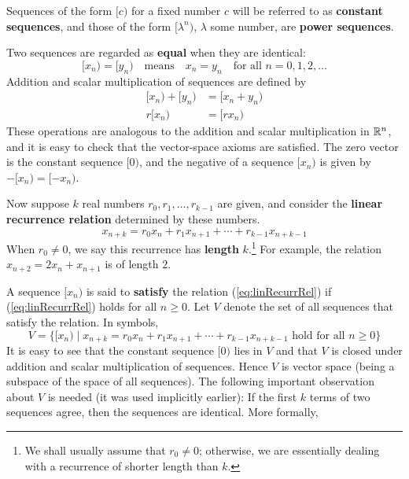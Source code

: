 \noindent Sequences of the form $[c)$ for a fixed number $c$ will be referred to as \textbf{constant sequences}, and those of the form $[\lambda^{n})$, $\lambda$ some number, are \textbf{power sequences}.


Two sequences are regarded as \textbf{equal} when they are identical:
\begin{equation*}
[x_n) = [y_n) \quad \mbox{means} \quad x_n = y_n \quad \mbox{for all } n = 0, 1, 2, \dots
\end{equation*}
Addition and scalar multiplication of sequences are defined by
\begin{align*}
[x_n) + [y_n) &= [x_n + y_n) \\
r[x_n) &= [rx_n)
\end{align*}
These operations are analogous to the addition and scalar multiplication in $\mathbb{R}^n$, and it is easy to check that the vector-space axioms are satisfied. The zero vector is the constant sequence $[0)$, and the negative of a sequence $[x_{n})$ is given by $-[x_{n}) = [-x_{n})$.


Now suppose $k$ real numbers $r_{0}, r_{1}, \dots, r_{k-1}$ are given, and consider the \textbf{linear recurrence relation} determined by these numbers.
\begin{equation}\label{eq:linRecurrRel}
x_{n+k} = r_{0}x_{n} + r_{1}x_{n+1} + \cdots + r_{k-1}x_{n+k-1}
\end{equation}
When $r_{0} \neq 0$, we say this recurrence has \textbf{length} $k$.\footnote{We shall usually assume that $r_{0} \neq 0$; otherwise, we are essentially dealing with a recurrence of shorter length than $k$.} For example, the relation $x_{n+2} = 2x_{n}+ x_{n+1}$ is of length $2$.


A sequence $[x_{n})$ is said to \textbf{satisfy} the relation (\ref{eq:linRecurrRel}) if (\ref{eq:linRecurrRel}) holds for all $n \geq 0$. Let $V$ denote the set of all sequences that satisfy the relation. In symbols,
\begin{equation*}
V = \{[x_n) \mid x_{n+k} = r_{0}x_{n} + r_{1}x_{n+1} + \cdots + r_{k-1}x_{n+k-1} \mbox{ hold for all } n \geq 0\}
\end{equation*}
It is easy to see that the constant sequence $[0)$ lies in $V$ and that $V$ is closed under addition and scalar multiplication of sequences. Hence $V$ is vector space (being a subspace of the space of all sequences). The following important observation about $V$ is needed (it was used implicitly earlier): If the first $k$ terms of two sequences agree, then the sequences are identical. More formally,


